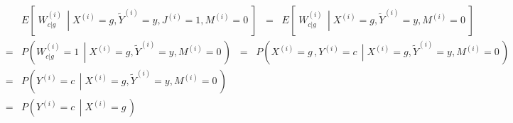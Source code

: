 \begin{eqnarray*}
&&
	E\!\left[\;\left.W^{(i)}_{c \vert g}\,\;\right\vert\;X^{(i)}=g,\widetilde{Y}^{(i)}=y,J^{(i)}=1,M^{(i)}=0\;\right]
\;\;=\;\;
	E\!\left[\;\left.W^{(i)}_{c \vert g}\,\;\right\vert\;X^{(i)}=g,\widetilde{Y}^{(i)}=y,M^{(i)}=0\;\right]
\\
&=&
	P\!\left(\left.W^{(i)}_{c \vert g}=1\,\;\right\vert\;X^{(i)}=g,\widetilde{Y}^{(i)}=y,M^{(i)}=0\,\right)
\;\;=\;\;
	P\!\left(\left.X^{(i)} = g\,,Y^{(i)} = c\,\;\right\vert\;X^{(i)}=g,\widetilde{Y}^{(i)}=y,M^{(i)}=0\,\right)
\\
&=&
	P\!\left(\left.Y^{(i)} = c\,\;\right\vert\;X^{(i)}=g,\widetilde{Y}^{(i)}=y,M^{(i)}=0\,\right)
\\
&=&
	P\!\left(\left.Y^{(i)} = c\,\;\right\vert\;X^{(i)}=g\,\right)
\end{eqnarray*}



\renewcommand{\theenumi}{\roman{enumi}}
\renewcommand{\labelenumi}{\textnormal{(\theenumi)}$\;\;$}


